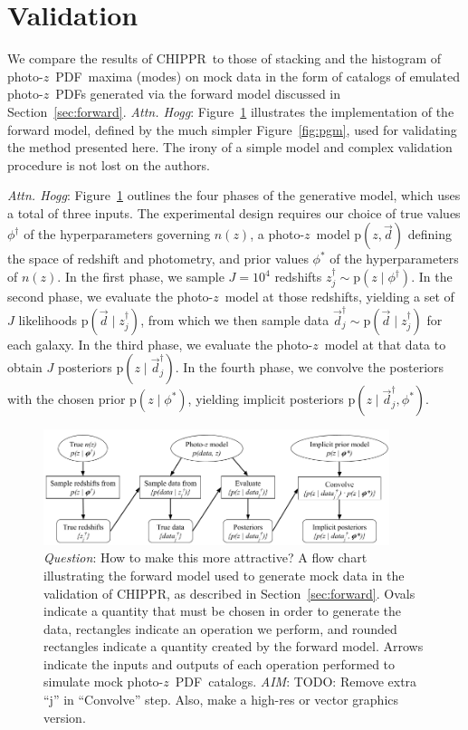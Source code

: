\documentclass[iop]{emulateapj}
\newcommand{\todo}[3]{{\color{#2}\emph{#1}: #3}}
\newcommand{\aim}[1]{\todo{AIM}{red}{#1}}
\newcommand{\dwh}[1]{\todo{Attn. Hogg}{blue}{#1}}
\newcommand{\que}[1]{\todo{Question}{cyan}{#1}}
\newcommand{\Sect}[1]{Section~\ref{#1}}
\newcommand{\Fig}[1]{Figure~\ref{#1}}
\newcommand{\project}[1]{\textsc{#1}}
\newcommand{\Chippr}{\project{CHIPPR}}%
\newcommand{\data}{\ensuremath{\vec{d}}}%
\newcommand{\pr}[1]{\ensuremath{\mathrm{p}(#1)}}%
\newcommand{\gvn}{\mid}%
\newcommand{\pz}{photo-$z$}
\newcommand{\pzpdf}{\pz\ PDF}%
\newcommand{\nz}{$n(z)$}
\begin{document}
\section{Validation}
\label{sec:alldata}

We compare the results of \Chippr\ to those of stacking and the histogram of \pzpdf\ maxima (modes) on mock data in the form of catalogs of emulated \pzpdf s generated via the forward model discussed in \Sect{sec:forward}.
\dwh{\Fig{fig:flowchart} illustrates the implementation of the forward model, defined by the much simpler \Fig{fig:pgm}, used for validating the method presented here.
The irony of a simple model and complex validation procedure is not lost on the authors.}

\dwh{\Fig{fig:flowchart} outlines the four phases of the generative model, which uses a total of three inputs.
The experimental design requires our choice of true values $\phi^{\dagger}$ of the hyperparameters governing \nz, a \pz\ model $\pr{z, \data}$ defining the space of redshift and photometry, and prior values $\phi^{*}$ of the hyperparameters of \nz.
In the first phase, we sample $J = 10^{4}$ redshifts $z_{j}^{\dagger} \sim \pr{z \gvn \phi^{\dagger}}$.
In the second phase, we evaluate the \pz\ model at those redshifts, yielding a set of $J$ likelihoods $\pr{\data \gvn z_{j}^{\dagger}}$, from which we then sample data $\data_{j}^{\dagger} \sim \pr{\data \gvn z_{j}^{\dagger}}$ for each galaxy.
In the third phase, we evaluate the \pz\ model at that data to obtain $J$ posteriors $\pr{z \gvn \data_{j}^{\dagger}}$.
In the fourth phase, we convolve the posteriors with the chosen prior $\pr{z \gvn \phi^{*}}$, yielding implicit posteriors $\pr{z \gvn \data_{j}^{\dagger}, \phi^{*}}$.}

\begin{figure}
	\begin{center}
		\includegraphics[width=0.9\textwidth]{figures/chippr/flowchart.png}
		\caption{
			\que{How to make this more attractive?}
			A flow chart illustrating the forward model used to generate mock data in the validation of \Chippr, as described in \Sect{sec:forward}.
			Ovals indicate a quantity that must be chosen in order to generate the data, rectangles indicate an operation we perform, and rounded rectangles indicate a quantity created by the forward model.
			Arrows indicate the inputs and outputs of each operation performed to simulate mock \pzpdf\ catalogs.
			\aim{TODO: Remove extra ``j'' in ``Convolve'' step.
			Also, make a high-res or vector graphics version.}
			}
		\label{fig:flowchart}
	\end{center}
\end{figure}
\end{document}
